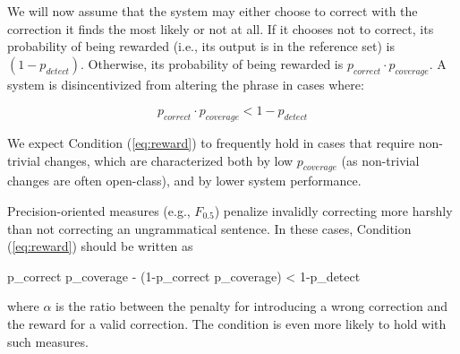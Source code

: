 \documentclass[11pt, a4paper]{article}
\newenvironment{myequation}{
  \vspace{-1em}
 \begin{equation}
}{
 \end{equation}
 \vspace{-1.2em}
}
\newenvironment{myequation*}{
	\vspace{-1em}
	\begin{equation*}
}{
\end{equation*}
\vspace{-1.2em}
}
\begin{document}
We will now assume that the system may either choose to correct with the correction it finds 
the most likely or not at all. If it chooses not to correct, its probability of being rewarded 
(i.e., its output is in the reference set) is $(1-p_{detect})$. Otherwise, its probability
of being rewarded is $p_{correct} \cdot p_{coverage}$.
A system is disincentivized from altering the phrase in cases where:

\begin{small}
	\begin{myequation}
		\label{eq:reward}
		p_{correct} \cdot p_{coverage} < 1-p_{detect} 
	\end{myequation}
\end{small}


We expect Condition (\ref{eq:reward}) to frequently hold in cases that
require non-trivial changes, which are characterized both by low $p_{coverage}$ (as non-trivial
changes are often open-class), and by lower system performance.

Precision-oriented measures (e.g., $F_{0.5}$) penalize invalidly correcting more
harshly than not correcting an ungrammatical sentence.
In these cases, Condition (\ref{eq:reward}) should be written as

\begin{small}
	\begin{myequation*}
		p_{correct} \cdot p_{coverage} - \left(1-p_{correct} \cdot p_{coverage}\right) \alpha < 1-p_{detect} 
	\end{myequation*}
\end{small}

\noindent
where $\alpha$ is the ratio between the penalty for introducing a wrong correction and the reward for a valid correction. The condition is even more likely to hold with such measures.


\end{document}
